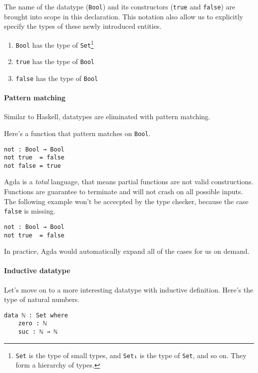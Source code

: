 \documentclass[../thesis.tex]{subfiles}
\begin{document}
The name of the datatype ({\lstinline|Bool|}) and its constructors
({\lstinline|true|} and {\lstinline|false|}) are brought into scope in this declaration.
This notation also allow us to explicitly specify the types of these newly introduced entities.

\begin{enumerate}
    \item {\lstinline|Bool|} has the type of {\lstinline|Set|}\footnote{{\lstinline|Set|} is the type of small types, and {\lstinline|Set₁|} is the type
of {\lstinline|Set|}, and so on. They form a hierarchy of types.}
    \item {\lstinline|true|} has the type of {\lstinline|Bool|}
    \item {\lstinline|false|} has the type of {\lstinline|Bool|}
\end{enumerate}

\paragraph{Pattern matching}
Similar to Haskell, datatypes are eliminated with pattern matching.

Here's a function that pattern matches on {\lstinline|Bool|}.

\begin{lstlisting}
not : Bool → Bool
not true  = false
not false = true
\end{lstlisting}

Agda is a \textit{total} language, that means partial functions are not valid constructions.
Functions are guarantee to terminate and will not crash on all possible inputs.
The following example won't be accecpted by the type checker, because the case
{\lstinline|false|} is missing.

\begin{lstlisting}
not : Bool → Bool
not true  = false
\end{lstlisting}

In practice, Agda would automatically expand all of the cases for us on demand.

\paragraph{Inductive datatype} Let's move on to a more interesting datatype with
inductive definition. Here's the type of natural numbers.
\begin{lstlisting}
data ℕ : Set where
    zero : ℕ
    suc : ℕ → ℕ
\end{lstlisting}
\end{document}
